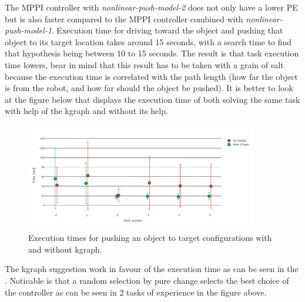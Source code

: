 
The \ac{MPPI} controller with \textit{nonlinear-push-model-2} does not only have a lower \ac{PE} but is also faster compared to the \ac{MPPI} controller combined with \textit{nonlinear-push-model-1}. Execution time for driving toward the object and pushing that object to its target location takes around 15 seconds, with a search time to find that hypothesis being between 10 to 15 seconds. The result is that task execution time lowers, bear in mind that this result has to be taken with a grain of salt because the execution time is correlated with the path length (how far the object is from the robot, and how far should the object be pushed). It is better to look at the figure below that displays the execution time of both solving the same task with help of the \ac{kgraph} and without its help.

\begin{figure}[H]
    \centering
    \includegraphics[width=0.9\textwidth]{figures/results/random_push_with_without_kgraph}
    \caption{Execution times for pushing an object to target configurations with and without \ac{kgraph}.}%
    \label{fig:random_push_with_without_kgraph}
\end{figure}



The \ac{kgraph} suggestion work in favour of the execution time as can be seen in the . Noticable is that a random selection by pure change selects the best choice of the controller as can be seen in 2 tasks of experience in the figure above.

